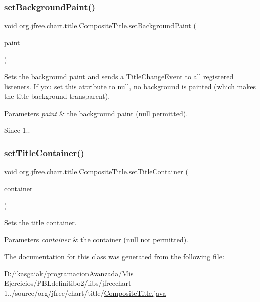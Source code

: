 \subsubsection{\texorpdfstring{set\+Background\+Paint()}{setBackgroundPaint()}}
{\footnotesize\ttfamily void org.\+jfree.\+chart.\+title.\+Composite\+Title.\+set\+Background\+Paint (\begin{DoxyParamCaption}\item[{Paint}]{paint }\end{DoxyParamCaption})}

Sets the background paint and sends a \mbox{\hyperlink{}{Title\+Change\+Event}} to all registered listeners. If you set this attribute to {\ttfamily null}, no background is painted (which makes the title background transparent).


\begin{DoxyParams}{Parameters}
{\em paint} & the background paint ({\ttfamily null} permitted).\\
\hline
\end{DoxyParams}
\begin{DoxySince}{Since}
1.. 
\end{DoxySince}
\mbox{\label{classorg_1_1jfree_1_1chart_1_1title_1_1_composite_title_aa780f0cc2f4a2301a7440c9b8c8b3c07}} 
\subsubsection{\texorpdfstring{set\+Title\+Container()}{setTitleContainer()}}
{\footnotesize\ttfamily void org.\+jfree.\+chart.\+title.\+Composite\+Title.\+set\+Title\+Container (\begin{DoxyParamCaption}\item[{\mbox{\hyperlink{classorg_1_1jfree_1_1chart_1_1block_1_1_block_container}{Block\+Container}}}]{container }\end{DoxyParamCaption})}

Sets the title container.


\begin{DoxyParams}{Parameters}
{\em container} & the container ({\ttfamily null} not permitted). \\
\hline
\end{DoxyParams}


The documentation for this class was generated from the following file\+:\begin{DoxyCompactItemize}
\item 
D\+:/ikasgaiak/programacion\+Avanzada/\+Mis Ejercicios/\+P\+B\+Ldefinitibo2/libs/jfreechart-\/1../source/org/jfree/chart/title/\mbox{\hyperlink{_composite_title_8java}{Composite\+Title.\+java}}\end{DoxyCompactItemize}

